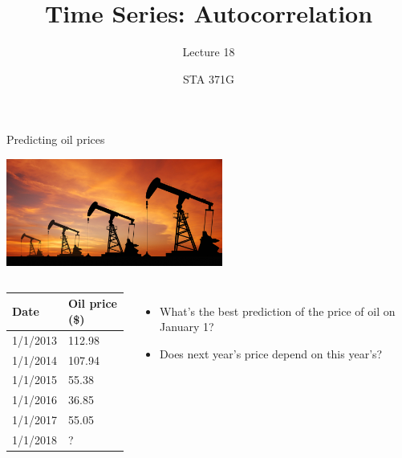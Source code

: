 \documentclass{beamer}\usepackage[]{graphicx}\usepackage[]{color}
\title{Time Series: Autocorrelation}
\subtitle{Lecture 18}
\author{STA 371G}
\begin{document}
  
  

  \frame{\maketitle}



  \begin{darkframes}
    
    \begin{frame}{Predicting oil prices}
      \fontsize{10}{10}\selectfont
      \begin{center}
        \includegraphics[width=2.8in]{pumpjack} \\
      \end{center} 
      
      \vspace{-0.1in}
      \begin{columns}[onlytextwidth]
            \begin{center}
              \begin{tabular}{ll}
              \hline
              Date & Oil price (\$) \\
              \hline
              1/1/2013 & 112.98  \\
              1/1/2014 & 107.94 \\
              1/1/2015 & 55.38 \\
              1/1/2016 & 36.85 \\
              1/1/2017 & 55.05 \\
              1/1/2018 & ? \\
              \hline 
            \end{tabular}
          \end{center} \pause
              
          \begin{itemize}[<+->]
            \item What's the best prediction of the price of oil on January 1?
            \item Does next year's price depend on this year's?
          \end{itemize}
      \end{columns}
    \end{frame}
    

\end{darkframes}
\end{document}

